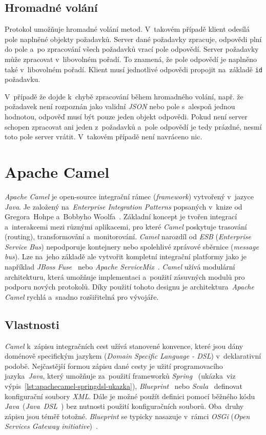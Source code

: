 \subsection{Hromadné volání}
\label{jsnorpcHromadnevolani}
Protokol umožňuje hromadné volání metod. V~takovém případě klient odesílá pole naplněné objekty požadavků. Server dané požadavky zpracuje, odpovědi plní do pole a~po zpracování všech požadavků vrací pole odpovědí. Server požadavky může zpracovat v~libovolném pořadí. To znamená, že pole odpovědí je naplněno také v~libovolném pořadí. Klient musí jednotlivé odpovědi propojit na~základě \texttt{id} požadavku. 

V~případě že dojde k~chybě zpracování během hromadného volání, např. že požadavek není rozpoznán jako validní \emph{JSON} nebo pole s~alespoň jednou hodnotou, odpověď musí být pouze jeden objekt odpovědi. Pokud není server schopen zpracovat ani jeden z~požadavků a~pole odpovědí je tedy prázdné, nesmí toto pole server vrátit. V~takovém případě není navráceno nic.

\section{Apache Camel}
\label{camel}
\emph{Apache Camel} je open-source integrační rámec (\emph{framework}) vytvořený v~jazyce \emph{Java}. Je založený na~\emph{Enterprise Integration Patterns} popsaných v~knize od Gregora~Hohpe a~Bobbyho Woolfa~\cite{Hohpe2004}. Základní koncept je tvořen integrací a~interakcemi mezi různými aplikacemi, pro které \emph{Camel} poskytuje trasování (routing), transformování a~monitorování. \emph{Camel} narozdíl od \emph{ESB} (\emph{Enterprise Service Bus}) nepodporuje kontejnery nebo spolehlivé zprávové sběrnice (\emph{message bus}). Lze na~jeho základě ale vytvořit kompletní integrační platformy jako je například \emph{JBoss Fuse}~\cite{JBossFuse} nebo \emph{Apache ServiceMix}~\cite{ApacheServiceMix}. \emph{Camel} užívá modulární architekturu, která umožňuje implementaci a~použití zásuvných modulů pro podporu nových protokolů. Díky použití tohoto designu je architektura~\emph{Apache Camel} rychlá a~snadno rozšiřitelná pro vývojáře.

\subsection{Vlastnosti}
\label{camelVlastnosti}
\emph{Camel} k~zápisu integračních cest užívá stanovené konvence, které jsou dány doménově specifickým jazykem (\emph{Domain Specific Language - DSL}) v~deklarativní podobě. Nejčastější formou zápisu dané cesty je užití programovacího jazyka~\emph{Java}, který umožňuje za~použití frameworků \emph{Spring}~\cite{SpringFramework} (ukázka~viz výpis~\ref{lst:apachecamel-springdsl-ukazka}), \emph{Blueprint}~\cite{BlueprintFramework} nebo \emph{Scala}~\cite{ScalaFramewoek} definovat konfigurační soubory \emph{XML}. Dále je možné použít definici pomocí běžného kódu \emph{Java}~(\emph{Java~DSL}~\cite{JavaDSLFramework}) bez nutnosti použití konfiguračních souborů. Oba~druhy zápisu jsou téměř totožné. \emph{Blueprint} se typicky nasazuje v~rámci \emph{OSGi} (\emph{Open Services Gateway initiative})~\cite{OSGi}.

